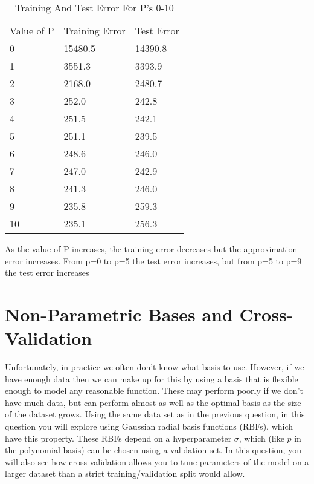 \documentclass{article}
\def\gre#1{{\color{gre}#1}}
\begin{document}
\begin{table}[h]
\centering
\caption{Training And Test Error For P's 0-10}
\label{my-label}
\begin{tabular}{lll}
\cline{2-2}
\multicolumn{1}{l|}{Value of P} & \multicolumn{1}{l|}{Training Error} & Test Error \\ \cline{2-2}
0                               & 15480.5                             & 14390.8    \\
1                               & 3551.3                              & 3393.9     \\
2                               & 2168.0                              & 2480.7     \\
3                               & 252.0                               & 242.8      \\
4                               & 251.5                               & 242.1      \\
5                               & 251.1                               & 239.5      \\
6                               & 248.6                               & 246.0      \\
7                               & 247.0                               & 242.9      \\
8                               & 241.3                               & 246.0      \\
9                               & 235.8                               & 259.3      \\
10                              & 235.1                               & 256.3
\end{tabular}
\end{table}

\gre{As the value of P increases, the training error decreases but the approximation error increases. From p=0 to
p=5 the test error increases, but from p=5 to p=9 the test error increases}

\section{Non-Parametric Bases and Cross-Validation}

Unfortunately, in practice we often don't know what basis to use.
However, if we have enough data then we can make up for this by using a basis that is flexible enough to
model any reasonable function. These may perform poorly if we don't have much data, but can
 perform almost as well as the optimal basis as the size of the dataset grows.
Using the same data set as in the previous question,
in this question you will explore using Gaussian radial basis functions (RBFs),
 which have this property. These RBFs depend on a hyperparameter $\sigma$, which
 (like $p$ in the polynomial basis) can be chosen using a validation set.
 In this question, you will also see how cross-validation allows you to tune
 parameters of the model on a larger dataset than a strict training/validation split would allow.
\end{document}
